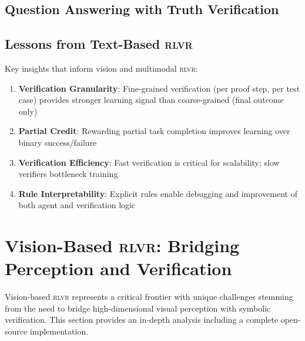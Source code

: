 \documentclass[11pt,a4paper]{article}
\newcommand{\rlvr}{\textsc{rlvr}}
\begin{document}
\subsection{Question Answering with Truth Verification}
\label{sec:qa_verification}


\subsection{Lessons from Text-Based \rlvr{}}
\label{sec:text_lessons}

Key insights that inform vision and multimodal \rlvr{}:

\begin{enumerate}[leftmargin=*]
    \item \textbf{Verification Granularity}: Fine-grained verification (per proof step, per test case) provides stronger learning signal than coarse-grained (final outcome only)
    
    \item \textbf{Partial Credit}: Rewarding partial task completion improves learning over binary success/failure
    
    \item \textbf{Verification Efficiency}: Fast verification is critical for scalability; slow verifiers bottleneck training
    
    \item \textbf{Rule Interpretability}: Explicit rules enable debugging and improvement of both agent and verification logic
\end{enumerate}

\section{Vision-Based \rlvr{}: Bridging Perception and Verification}
\label{sec:vision}

Vision-based \rlvr{} represents a critical frontier with unique challenges stemming from the need to bridge high-dimensional visual perception with symbolic verification. This section provides an in-depth analysis including a complete open-source implementation.
\end{document}
